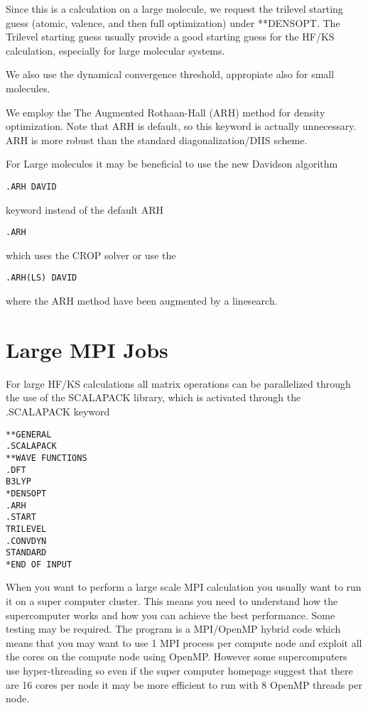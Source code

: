 Since this is a calculation on a large molecule, we request the trilevel starting 
guess\cite{trilevel1, trilevel2} (atomic, valence, and then full optimization) under **DENSOPT. 
The Trilevel starting guess usually provide a good starting guess 
for the HF/KS calculation, especially for large molecular systems. 
 
We also use the dynamical convergence threshold, appropiate also for small molecules. 

We employ the The Augmented Rothaan-Hall (ARH) method for density optimization. 
Note that ARH is default, so this keyword is actually unnecessary.
ARH is more robust than the standard diagonalization/DIIS scheme.

For Large molecules it may be beneficial to use the new Davidson algorithm 

\begin{verbatim}
.ARH DAVID
\end{verbatim}

keyword instead of the default ARH

\begin{verbatim}
.ARH
\end{verbatim}
which uses the CROP solver or use the 
\begin{verbatim}
.ARH(LS) DAVID
\end{verbatim}
where the ARH method have been augmented by a linesearch. 

\section{Large MPI Jobs}

For large HF/KS calculations all matrix operations can be parallelized through the use of the SCALAPACK library, which is activated through the .SCALAPACK keyword 

\begin{verbatim}
**GENERAL
.SCALAPACK
**WAVE FUNCTIONS
.DFT
B3LYP
*DENSOPT
.ARH
.START
TRILEVEL
.CONVDYN
STANDARD
*END OF INPUT
\end{verbatim}


When you want to perform a large scale MPI calculation you usually want to run it on a super computer cluster. This means you need to understand how the supercomputer works and how you can achieve the best performance. Some testing may be required. The {\lsdalton} program is a MPI/OpenMP hybrid code which means that you may want to use 1 MPI process per compute node and exploit all the cores on the compute node using OpenMP. However some supercomputers use hyper-threading so even if the super computer homepage suggest that there are 16 cores per node  it may be more efficient to run with 8 OpenMP threads per node.    

